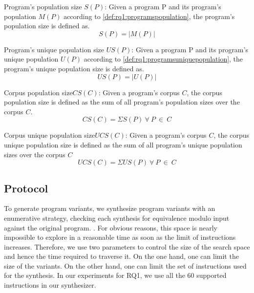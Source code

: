 \begin{metric}{Program's population size $S(P)$:}\label{metric:rq1:PS}
    \normalfont 
    Given a program P and its program's population $M(P)$ according to \autoref{def:rq1:programspopulation}, the program's population size is defined as.\\
    $$
        S(P)=|M(P)|
    $$
\end{metric}


\begin{metric}{Program's unique population size $US(P)$:}\label{metric:rq1:UP}
    \normalfont 
    Given a program P and its program's unique population $U(P)$ according to \autoref{def:rq1:programsuniquepopulation}, the program's unique population size is defined as.\\
    $$
        US(P)=|U(P)|
    $$
\end{metric}

\newcommand{\corpuspopulationsizename}{Corpus population size\xspace}
\newcommand{\corpusuniquepopulationsizename}{Corpus unique population size\xspace}

\begin{metric}{\corpuspopulationsizename$CS(C)$:}\label{metric:rq1:corpus_pop}
    \normalfont 
    Given a program's corpus $C$, the corpus population size is defined as the sum of all program's population sizes over the corpus $C$.\\
    $$
        CS(C)=\Sigma{S(P)}\ \forall\ P\ \in\ C
    $$
\end{metric}

\begin{metric}{\corpusuniquepopulationsizename$UCS(C)$:}\label{metric:rq1:corpus_pop_unique}
    \normalfont 
    Given a program's corpus $C$, the corpus unique population size is defined as the sum of all program's unique population sizes over the corpus $C$\\
    $$
    UCS(C)=\Sigma{US(P)}\ \forall\ P\ \in\ C
    $$
\end{metric}


\subsection*{Protocol}
To generate program variants, we synthesize program variants with an enumerative strategy, checking each synthesis for equivalence modulo input \cite{Li2018} against the original program. . For obvious reasons, this space is nearly impossible to explore in a reasonable time as soon as the limit of instructions increases.
Therefore, we use two parameters to control the size of the search space and hence the time required to traverse it.
On the one hand, one can limit the size of the variants. On the other hand, one can limit the set of instructions used for the synthesis. In our experiments for RQ1, we use all the $60$ supported instructions in our synthesizer.


